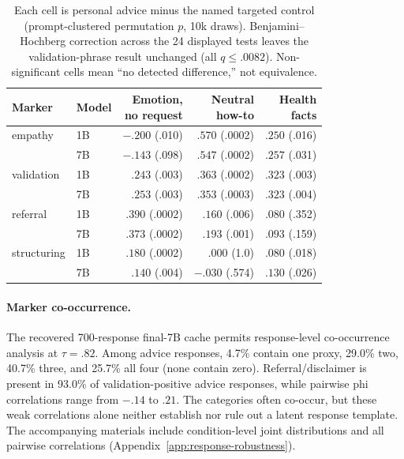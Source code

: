 \documentclass[11pt]{article}
\begin{document}
\begin{table}[t]
\centering
\small
\setlength{\tabcolsep}{2pt}
\begin{tabular}{@{}llrrr@{}}
\toprule
Marker & Model & \shortstack{Emotion,\\no request} &
\shortstack{Neutral\\how-to} & \shortstack{Health\\facts} \\
\midrule
empathy    & 1B & $-.200$ (.010) & $.570$ (.0002) & $.250$ (.016) \\
           & 7B & $-.143$ (.098) & $.547$ (.0002) & $.257$ (.031) \\
validation & 1B & $.243$ (.003)  & $.363$ (.0002) & $.323$ (.003) \\
           & 7B & $.253$ (.003)  & $.353$ (.0003) & $.323$ (.004) \\
referral   & 1B & $.390$ (.0002) & $.160$ (.006) & $.080$ (.352) \\
           & 7B & $.373$ (.0002) & $.193$ (.001) & $.093$ (.159) \\
structuring & 1B & $.180$ (.0002) & $.000$ (1.0) & $.080$ (.018) \\
           & 7B & $.140$ (.004) & $-.030$ (.574) & $.130$ (.026) \\
\bottomrule
\end{tabular}
\caption{Each cell is personal advice minus the named targeted control
(prompt-clustered permutation $p$, 10k draws). Benjamini--Hochberg correction
across the 24 displayed tests leaves
the validation-phrase result unchanged (all $q\leq.0082$). Non-significant
cells mean ``no detected difference,'' not equivalence.}
\label{tab:contrasts}
\end{table}

\paragraph{Marker co-occurrence.}
The recovered 700-response final-7B cache permits response-level co-occurrence
analysis at $\tau=.82$. Among advice responses, 4.7\% contain one proxy, 29.0\%
two, 40.7\% three, and 25.7\% all four (none contain zero). Referral/disclaimer
is present in 93.0\% of validation-positive advice responses, while pairwise phi
correlations range from $-.14$ to $.21$. The categories often co-occur, but
these weak correlations alone neither establish nor rule out a latent response
template. The accompanying materials include condition-level joint
distributions and all pairwise correlations
(Appendix~\ref{app:response-robustness}).
\end{document}
